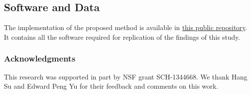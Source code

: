 \documentclass{article}
\begin{document}
\subsection{Software and Data}
The implementation of the proposed method is available in \href{https://github.com/iurteaga/bandits}{this public repository}. It contains all the software required for replication of the findings of this study.

\subsubsection*{Acknowledgments}
This research was supported in part by NSF grant SCH-1344668. We thank Hang Su and Edward Peng Yu for their feedback and comments on this work.



\end{document}
